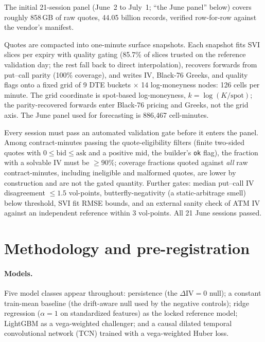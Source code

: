 \documentclass[11pt]{article}
\newcommand{\dIV}{\Delta\mathrm{IV}}
\begin{document}
The initial 21-session panel (June~2 to July~1; ``the June panel'' below)
covers roughly 858\,GB of raw quotes, 44.05 billion records, verified
row-for-row against the vendor's manifest.

Quotes are compacted into one-minute surface snapshots. Each snapshot fits
SVI slices \cite{gatheral2014} per expiry with quality gating (85.7\% of
slices trusted on the reference validation day; the rest fall back to direct
interpolation), recovers forwards from put--call parity (100\% coverage),
and writes IV, Black-76 \cite{black1976} Greeks, and quality flags onto a
fixed grid of 9 DTE buckets $\times$ 14 log-moneyness nodes: 126 cells
per minute. The grid coordinate is spot-based log-moneyness,
$k = \log(K/\text{spot})$; the parity-recovered forwards enter Black-76
pricing and Greeks, not the grid axis. The June panel used for forecasting is 886{,}467 cell-minutes.

Every session must pass an automated validation gate before it enters the
panel. Among contract-minutes passing the quote-eligibility filters (finite
two-sided quotes with $0 \le \text{bid} \le \text{ask}$ and a positive mid, the builder's \texttt{ok} flag), the fraction with a solvable IV must be
$\geq 90\%$; coverage fractions quoted against \emph{all} raw
contract-minutes, including ineligible and malformed quotes, are lower by
construction and are not the gated quantity. Further gates: median put--call
IV disagreement $\leq 1.5$ vol-points, butterfly-negativity
(a static-arbitrage smell) below threshold, SVI fit RMSE bounds, and an
external sanity check of ATM IV against an independent reference within
3 vol-points. All 21 June sessions passed.

\section{Methodology and pre-registration}
\label{sec:method}

\paragraph{Models.} Five model classes appear throughout: persistence (the
$\dIV=0$ null); a constant train-mean baseline (the drift-aware null used by
the negative controls); ridge regression ($\alpha = 1$ on standardized
features) as the locked reference model; LightGBM as a vega-weighted
challenger; and a causal dilated temporal convolutional network (TCN)
\cite{bai2018} trained with a vega-weighted Huber loss.
\end{document}
